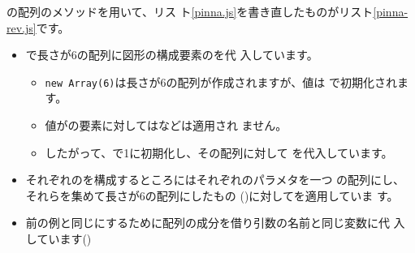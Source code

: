 \JS の配列のメソッドを用いて、\JS リス
ト\ref{pinna.js}を書き直したものが\JS リスト\ref{pinna-rev.js}です。

\begin{itemize}
 \item {}で長さが6の配列に図形の構成要素のを代
			 入しています。
			 \begin{itemize}
				\item \Verb+new Array(6)+は長さが6の配列が作成されますが、値は
							で初期化されます。
				\item 値がの要素に対してはなどは適用され
							ません。
				\item したがって、で1に初期化し、その配列に対して
							を代入しています。
			 \end{itemize}
 \item それぞれのを構成するところにはそれぞれのパラメタを一つ
			 の配列にし、それらを集めて長さが6の配列にしたもの
			 ()に対してを適用していま
			 す。
 \item 前の例と同じにするために配列の成分を借り引数の名前と同じ変数に代
			 入しています()
\end{itemize}